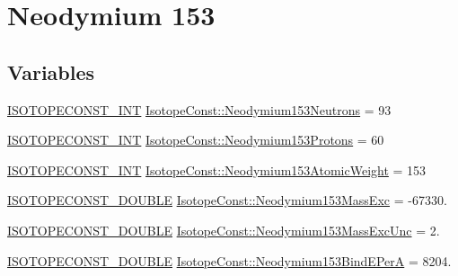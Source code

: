 \hypertarget{group___isotope_const-_neodymium-_nd153}{}\section{Neodymium 153}
\label{group___isotope_const-_neodymium-_nd153}
\subsection*{Variables}
\begin{DoxyCompactItemize}
\item 
\mbox{\hyperlink{group___isotope_const-_macros_ga5f18360b3e99483a35c32d789e62621c}{I\+S\+O\+T\+O\+P\+E\+C\+O\+N\+S\+T\+\_\+\+I\+NT}} \mbox{\hyperlink{group___isotope_const-_neodymium-_nd153_ga195de422e1fd3008017d90df0fb3a26e}{Isotope\+Const\+::\+Neodymium153\+Neutrons}} = 93
\item 
\mbox{\hyperlink{group___isotope_const-_macros_ga5f18360b3e99483a35c32d789e62621c}{I\+S\+O\+T\+O\+P\+E\+C\+O\+N\+S\+T\+\_\+\+I\+NT}} \mbox{\hyperlink{group___isotope_const-_neodymium-_nd153_ga01d234b0cec4ac938c5ac12c952b26fb}{Isotope\+Const\+::\+Neodymium153\+Protons}} = 60
\item 
\mbox{\hyperlink{group___isotope_const-_macros_ga5f18360b3e99483a35c32d789e62621c}{I\+S\+O\+T\+O\+P\+E\+C\+O\+N\+S\+T\+\_\+\+I\+NT}} \mbox{\hyperlink{group___isotope_const-_neodymium-_nd153_ga2b3a676d30e8ae7c9735226bb5f3b8c5}{Isotope\+Const\+::\+Neodymium153\+Atomic\+Weight}} = 153
\item 
\mbox{\hyperlink{group___isotope_const-_macros_ga8f45a7272ce02c0b4c65c44636ed719a}{I\+S\+O\+T\+O\+P\+E\+C\+O\+N\+S\+T\+\_\+\+D\+O\+U\+B\+LE}} \mbox{\hyperlink{group___isotope_const-_neodymium-_nd153_ga932415d4580b496c97521c49d73ab3f8}{Isotope\+Const\+::\+Neodymium153\+Mass\+Exc}} = -\/67330.
\item 
\mbox{\hyperlink{group___isotope_const-_macros_ga8f45a7272ce02c0b4c65c44636ed719a}{I\+S\+O\+T\+O\+P\+E\+C\+O\+N\+S\+T\+\_\+\+D\+O\+U\+B\+LE}} \mbox{\hyperlink{group___isotope_const-_neodymium-_nd153_gab01b2ee5f8f62e34933721e3d9416c64}{Isotope\+Const\+::\+Neodymium153\+Mass\+Exc\+Unc}} = 2.
\item 
\mbox{\hyperlink{group___isotope_const-_macros_ga8f45a7272ce02c0b4c65c44636ed719a}{I\+S\+O\+T\+O\+P\+E\+C\+O\+N\+S\+T\+\_\+\+D\+O\+U\+B\+LE}} \mbox{\hyperlink{group___isotope_const-_neodymium-_nd153_ga596698d1edf4c9465f4f4944c4260bc7}{Isotope\+Const\+::\+Neodymium153\+Bind\+E\+PerA}} = 8204.
\item 

\end{DoxyCompactItemize}
